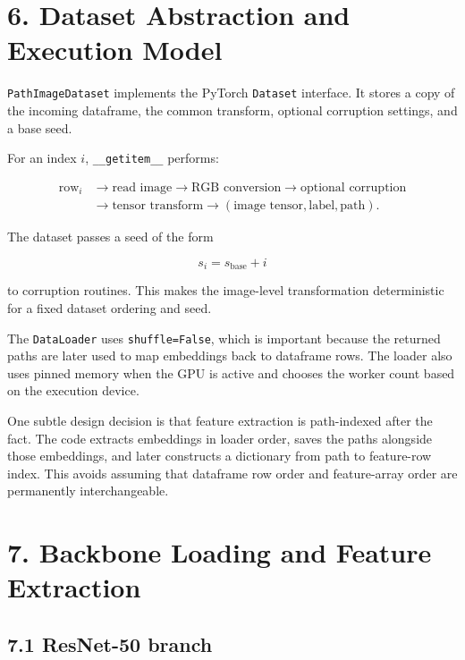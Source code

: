 \documentclass[
  11pt,
]{article}
\begin{document}
\section{6. Dataset Abstraction and Execution
Model}\label{dataset-abstraction-and-execution-model}

\texttt{PathImageDataset} implements the PyTorch \texttt{Dataset}
interface. It stores a copy of the incoming dataframe, the common
transform, optional corruption settings, and a base seed.

For an index \(i\), \texttt{\_\_getitem\_\_} performs:

\[
\begin{aligned}
\text{row}_i
&\rightarrow \text{read image}
\rightarrow \text{RGB conversion}
\rightarrow \text{optional corruption}\\
&\rightarrow \text{tensor transform}
\rightarrow (\text{image tensor},\text{label},\text{path}).
\end{aligned}
\]

The dataset passes a seed of the form

\[
s_i=s_{\mathrm{base}}+i
\]

to corruption routines. This makes the image-level transformation
deterministic for a fixed dataset ordering and seed.

The \texttt{DataLoader} uses \texttt{shuffle=False}, which is important
because the returned paths are later used to map embeddings back to
dataframe rows. The loader also uses pinned memory when the GPU is
active and chooses the worker count based on the execution device.

One subtle design decision is that feature extraction is path-indexed
after the fact. The code extracts embeddings in loader order, saves the
paths alongside those embeddings, and later constructs a dictionary from
path to feature-row index. This avoids assuming that dataframe row order
and feature-array order are permanently interchangeable.

\section{7. Backbone Loading and Feature
Extraction}\label{backbone-loading-and-feature-extraction}

\subsection{7.1 ResNet-50 branch}\label{resnet-50-branch}
\end{document}
